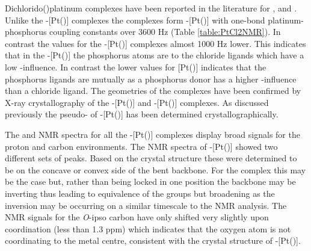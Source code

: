 Dichlorido(\Phxantphos)platinum complexes have been reported in the literature for \Phsixantphos, \Phthixantphos{} and \Phxantphos{}.\cite{Kranenburg1998b}  Unlike the \trans-[Pt(\tBuxantphos)] complexes the \Phxantphos{} complexes form \cis{}-[Pt(\Phxantphos)] with one-bond platinum-phosphorus coupling constants over 3600 Hz (Table \ref{table:PtCl2NMR}).  In contrast the values for the \trans-[Pt(\tBuxantphos)] complexes almost 1000 Hz lower.  This indicates that in the \cis-[Pt(\Phxantphos)] the phosphorus atoms are \trans{} to the chloride ligands which have a low \trans-influence.  In contrast the lower values for [Pt(\tBuxantphos)] indicates that the phosphorus ligands are mutually \trans{} as a phosphorus donor has a higher \trans-influence than a chloride ligand.  The \cis{} geometries of the \Phxantphos{} complexes have been confirmed by X-ray crystallography of the \cis{}-[Pt(\Phsixantphos)]\cite{Duren2007} and \cis{}-[Pt(\Phxantphos)]\cite{Niksch2010} complexes.  As discussed previously the pseudo-\trans{} of \trans-[Pt(\tButhixantphos)] has been determined crystallographically. 

The \proton{} and \carbon{} NMR spectra for all the \trans-[Pt(\tBuxantphos)] complexes display broad signals for the \tBu{} proton and carbon environments.  The NMR spectra of \trans-[Pt(\tButhixantphos)] showed two different sets of \tBu{} peaks.  Based on the crystal structure these were determined to be on the concave or convex side of the bent backbone.  For the \tBuxantphos{} complex this may be the case but, rather than being locked in one position the backbone may be inverting thus leading to equivalence of the \tBu{} groups but broadening as the inversion may be occurring on a similar timescale to the NMR analysis.  The \carbon{} NMR signals for the \emph{O}-ipso carbon have only shifted very slightly upon coordination (less than 1.3 ppm) which indicates that the oxygen atom is not coordinating to the metal centre, consistent with the crystal structure of \trans-[Pt(\tButhixantphos)].  

